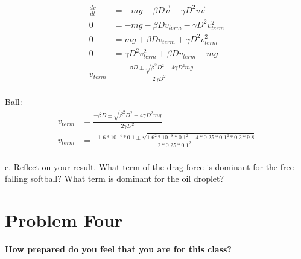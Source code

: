 \documentclass[10pt]{article} %
\begin{document}
\begin{align}
  \frac{dv}{dt} &= -mg −\beta D\vec{v} −\gamma D^2v\vec{v}\\
  0 &= -mg −\beta Dv_{term} −\gamma D^2v^2_{term}\\
  0 &= mg + \beta Dv_{term} + \gamma D^2v^2_{term}\\
  0 &= \gamma D^2v^2_{term} + \beta Dv_{term} + mg\\
  v_{term} &= \frac{-\beta D \pm \sqrt{\beta^2 D^2 - 4\gamma D^2mg}}{2\gamma D^2}\\
\end{align}

Ball:
\begin{align}
  v_{term} &= \frac{-\beta D \pm \sqrt{\beta^2 D^2 - 4\gamma D^2mg}}{2\gamma D^2}\\
  v_{term} &= \frac{-1.6*10^{-4}*0.1 \pm \sqrt{1.6^2*10^{-8}*0.1^2 - 4*0.25*0.1^2*0.2*9.8}}{2*0.25*0.1^2}\\  
\end{align}

c. Reflect on your result. What term of the drag  force is dominant  for the  free-falling 
softball? What term is dominant for the oil droplet?\\


\vspace{1 cm}       

\section{Problem Four}
\textbf{How prepared do you feel that you are for this class?} \\ \\
\end{document}
